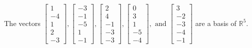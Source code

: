 \begin{exercise}
\begin{exerciseStatement}
  \end{exerciseStatement}
  \begin{exerciseAnswer}
   The vectors \(\left[\begin{array}{r}
1 \\
-4 \\
1 \\
2 \\
-3
\end{array}\right] , \left[\begin{array}{r}
-3 \\
-1 \\
-5 \\
1 \\
-1
\end{array}\right] , \left[\begin{array}{r}
2 \\
4 \\
-1 \\
-3 \\
-3
\end{array}\right] , \left[\begin{array}{r}
0 \\
3 \\
1 \\
-5 \\
-4
\end{array}\right] , \text{ and } \left[\begin{array}{r}
3 \\
-2 \\
-3 \\
-4 \\
-1
\end{array}\right]\) 
  	 are  a basis of \(\mathbb{R}^5\).
  


  \end{exerciseAnswer}
\end{exercise}